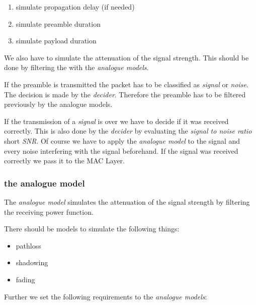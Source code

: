 \begin{enumerate}
\item simulate propagation delay (if needed)
\item simulate preamble duration
\item simulate payload duration
\end{enumerate}

We also have to simulate the attenuation of the signal strength. This should be done by filtering the with the \textit{analogue models}.

If the preamble is transmitted the packet has to be classified as \textit{signal} or \textit{noise}. The decision is made by the \textit{decider}. Therefore the preamble has to be filtered previously by the analogue models.

If the transmission of a \textit{signal} is over we have to decide if it was received correctly. This is also done by the \textit{decider} by evaluating the \textit{signal to noise ratio} short \textit{SNR}. Of course we have to apply the \textit{analogue model} to the signal and every noise interfering with the signal beforehand. If the signal was received correctly we pass it to the MAC Layer.

\subsubsection{the analogue model}
\label{analogueModel}

The \textit{analogue model} simulates the attenuation of the signal strength by filtering the receiving power function.

There should be models to simulate the following things:

\begin{itemize}
 \item pathloss
 \item shadowing
 \item fading
\end{itemize}

Further we set the following requirements to the \textit{analogue models}:

